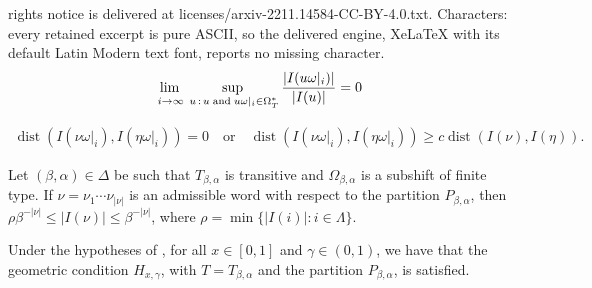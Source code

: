 \documentclass[10pt,a4paper]{amsart}
\begin{document}
rights notice is delivered at licenses/arxiv-2211.14584-CC-BY-4.0.txt. Characters: every retained excerpt is pure ASCII, so the delivered engine, XeLaTeX with its default Latin Modern text font, reports no missing character.
    \begin{align}\label{eq:condition_1}
        \adjustlimits
        \lim_{i \to \infty} \sup_{\; u\,:\,u\;\text{and}\;u\omega\vert_{i}\in\Omega_{T}^{*}} \frac{\lvert I(u\omega\vert_{i}) \rvert}{\lvert I(u) \rvert} = 0
    \end{align}

    \begin{align}\label{eq:condition_2}
        \operatorname{dist}(I(\nu\omega\vert_{i}), I(\eta\omega\vert_{i})) = 0
        \quad \text{or} \quad
        \operatorname{dist}(I(\nu\omega\vert_{i}), I(\eta\omega\vert_{i})) \geq c \operatorname{dist}(I(\nu), I(\eta)).
    \end{align}

\begin{lemma}\label{lem:geometric_lengths_of_cylinders}
Let $(\beta, \alpha) \in \Delta$ be such that $T_{\beta, \alpha}$ is transitive and $\Omega_{\beta, \alpha}$ is a subshift of finite type. If $\nu = \nu_{1} \cdots \nu_{\lvert \nu \rvert}$ is an admissible word with respect to the partition $P_{\beta,\alpha}$, then $\rho \beta^{-\lvert \nu \rvert} \leq  \lvert I(\nu) \rvert \leq \beta^{-\lvert \nu \rvert}$, where $\rho = \min \{ \lvert I(i) \rvert \colon i \in \Lambda \}$.
\end{lemma}

\begin{proposition}\label{prop:thm_SFT+Transitive_implies_winning}
Under the hypotheses of , for all $x \in [0, 1]$ and $\gamma \in (0, 1)$, we have that the geometric condition $H_{x, \gamma}$, with $T = T_{\beta, \alpha}$ and the partition $P_{\beta,\alpha}$, is satisfied.
\end{proposition}
\end{document}
